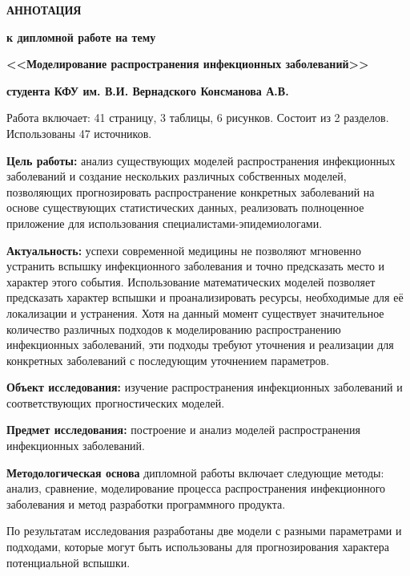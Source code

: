 \documentclass[a4paper,14pt,russian]{extreport}	%
\begin{document}
	\begin{center}
		\textbf{АННОТАЦИЯ}
		
		\textbf{к дипломной работе на тему}
		
		\textbf{<<Моделирование распространения инфекционных заболеваний>> }
		
		\textbf{студента КФУ им. В.И. Вернадского Консманова А.В.}
	\end{center}

Работа включает: 41 страницу, 3 таблицы, 6 рисунков. Состоит из 2 разделов. Использованы 47 источников. 

\textbf{Цель работы:} анализ существующих моделей распространения  инфекционных заболеваний и  создание нескольких различных собственных моделей, позволяющих прогнозировать распространение конкретных заболеваний на основе существующих статистических данных, реализовать полноценное приложение для использования  специалистами-эпидемиологами.

\textbf{Актуальность:} успехи современной медицины не позволяют мгновенно устранить вспышку инфекционного заболевания и точно предсказать место и характер этого события. Использование математических моделей позволяет предсказать характер вспышки и проанализировать ресурсы, необходимые для её локализации и устранения. Хотя на данный момент существует значительное  количество различных подходов к моделированию распространению инфекционных заболеваний, эти подходы требуют уточнения и реализации для конкретных заболеваний с последующим уточнением параметров.

\textbf{Объект исследования:} изучение распространения инфекционных заболеваний и соответствующих прогностических моделей.

\textbf{Предмет исследования:} построение и анализ моделей распространения инфекционных заболеваний.

\textbf{Методологическая основа} дипломной работы включает следующие методы: анализ, сравнение, моделирование процесса распространения инфекционного заболевания и метод разработки программного продукта.

По результатам исследования разработаны две модели с разными параметрами и подходами, которые могут быть использованы для  прогнозирования характера потенциальной вспышки.
\end{document}
